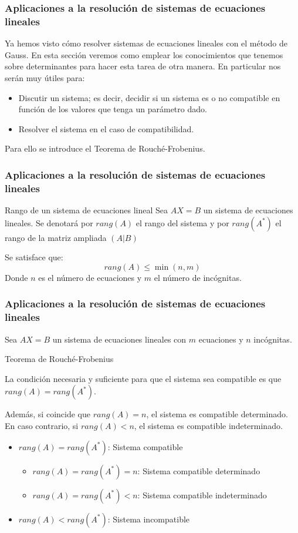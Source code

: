 \documentclass[aspectratio=169]{beamer}
\begin{document}
     \begin{frame}
  \frametitle{Aplicaciones a la resoluci\'on de sistemas de ecuaciones lineales}
Ya hemos visto c\'omo resolver sistemas de ecuaciones lineales con el m\'etodo de Gauss. En esta secci\'on veremos como emplear los conocimientos que tenemos sobre determinantes para hacer esta tarea de otra manera. En particular nos ser\'an muy \'utiles para:
\begin{itemize}
\item Discutir un sistema; es decir, decidir si un sistema es o no compatible en funci\'on de los valores que tenga un par\'ametro dado.
\item Resolver el sistema en el caso de compatibilidad.
\end{itemize}
Para ello se introduce el Teorema de Rouch\'e-Frobenius.
\end{frame} 

     \begin{frame}
  \frametitle{Aplicaciones a la resoluci\'on de sistemas de ecuaciones lineales}
     \begin{block}{Rango de un sistema de ecuaciones lineal}
Sea $AX=B$ un sistema de ecuaciones lineales. Se denotar\'a por $rang(A)$ el rango del sistema y por $rang(A^*)$ el rango de la matriz ampliada $(A|B)$
\end{block}
Se satisface que: 
\[rang(A) \leq \min(n,m)\]
Donde $n$ es el n\'umero de ecuaciones y $m$ el n\'umero de inc\'ognitas.
\end{frame} 


     \begin{frame}
  \frametitle{Aplicaciones a la resoluci\'on de sistemas de ecuaciones lineales}
  Sea $AX=B$ un sistema de ecuaciones lineales con $m$ ecuaciones y $n$ inc\'ognitas. 

     \begin{block}{Teorema de Rouch\'e-Frobenius}

La condici\'on necesaria y suficiente para que el sistema sea compatible es que $rang(A) = rang(A^*)$.

Adem\'as, si coincide que $rang(A) = n$, el sistema es compatible determinado. En caso contrario, si $rang(A)<n$, el sistema es compatible indeterminado.


\end{block}
\begin{itemize}
\item $rang(A) = rang(A^*)$: Sistema compatible
\begin{itemize}
\item $rang(A) = rang(A^*) = n$: Sistema compatible determinado
\item $rang(A) = rang(A^*)<n$: Sistema compatible indeterminado
\end{itemize}
\item $rang(A) < rang(A^*)$: Sistema incompatible
\end{itemize}
\end{frame} 
\end{document}
